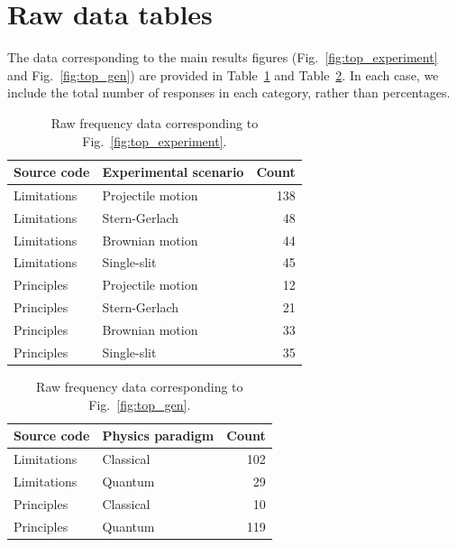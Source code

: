 \documentclass[english,aps,prstper,reprint,showpacs,longbibliography,superscriptaddress,nofootinbib]{revtex4-2}
\begin{document}
\section{Raw data tables}

The data corresponding to the main results figures (Fig.~\ref{fig:top_experiment} and Fig.~\ref{fig:top_gen}) are provided in Table~\ref{ta:top_experiment} and Table~\ref{ta:top_gen}. In each case, we include the total number of responses in each category, rather than percentages.

\begin{table}[tb] 
  \caption{Raw frequency data corresponding to Fig.~\ref{fig:top_experiment}.}
  \label{ta:top_experiment}
  \begin{ruledtabular}
    \begin{tabular}{llr}
    Source code & Experimental scenario & Count\\
    \hline
    Limitations & Projectile motion & 138\\
    Limitations & Stern-Gerlach & 48\\
    Limitations & Brownian motion & 44\\
    Limitations & Single-slit & 45\\
    Principles & Projectile motion & 12\\
    Principles & Stern-Gerlach & 21\\
    Principles & Brownian motion & 33\\
    Principles & Single-slit & 35\\
    \end{tabular}
  \end{ruledtabular}
\end{table}

\begin{table}[tb] 
  \caption{Raw frequency data corresponding to Fig.~\ref{fig:top_gen}.}
  \label{ta:top_gen}
  \begin{ruledtabular}
    \begin{tabular}{llr}
    Source code & Physics paradigm & Count\\
    \hline
    Limitations & Classical & 102\\
    Limitations & Quantum & 29\\
    Principles & Classical & 10 \\
    Principles & Quantum & 119\\
    \end{tabular}
  \end{ruledtabular}
\end{table}

 
\end{document}
